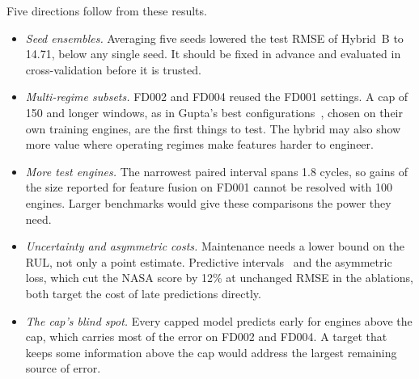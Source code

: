 Five directions follow from these results.
\begin{itemize}
\item \emph{Seed ensembles.} Averaging five seeds lowered the test RMSE of
Hybrid~B to 14.71, below any single seed. It should be fixed in advance and
evaluated in cross-validation before it is trusted.
\item \emph{Multi-regime subsets.} FD002 and FD004 reused the FD001 settings.
A cap of 150 and longer windows, as in Gupta's best
configurations~\cite{Gupta2026auditing}, chosen on their own training engines,
are the first things to test. The hybrid may also show more value where
operating regimes make features harder to engineer.
\item \emph{More test engines.} The narrowest paired interval spans 1.8
cycles, so gains of the size reported for feature fusion on FD001 cannot be
resolved with 100 engines. Larger benchmarks would give these comparisons the
power they need.
\item \emph{Uncertainty and asymmetric costs.} Maintenance needs a lower bound
on the RUL, not only a point estimate. Predictive intervals~\cite{Sharma2025uncertainty}
and the asymmetric loss, which cut the NASA score by 12\% at unchanged RMSE in
the ablations, both target the cost of late predictions directly.
\item \emph{The cap's blind spot.} Every capped model predicts early for
engines above the cap, which carries most of the error on FD002 and FD004.
A target that keeps some information above the cap would address the largest
remaining source of error.
\end{itemize}
